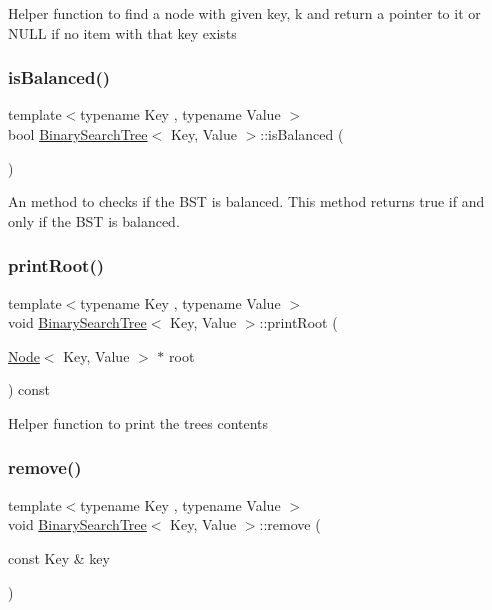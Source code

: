 Helper function to find a node with given key, k and return a pointer to it or N\+U\+LL if no item with that key exists \mbox{\label{classBinarySearchTree_afd462b85819b2ed73bde24c3383b673b}} 
\subsubsection{\texorpdfstring{is\+Balanced()}{isBalanced()}}
{\footnotesize\ttfamily template$<$typename Key , typename Value $>$ \\
bool \mbox{\hyperlink{classBinarySearchTree}{Binary\+Search\+Tree}}$<$ Key, Value $>$\+::is\+Balanced (\begin{DoxyParamCaption}{ }\end{DoxyParamCaption})}

An method to checks if the B\+ST is balanced. This method returns true if and only if the B\+ST is balanced. \mbox{\label{classBinarySearchTree_a6996f52ecfb5a0d1f62432a7b3b792b5}} 
\subsubsection{\texorpdfstring{print\+Root()}{printRoot()}}
{\footnotesize\ttfamily template$<$typename Key , typename Value $>$ \\
void \mbox{\hyperlink{classBinarySearchTree}{Binary\+Search\+Tree}}$<$ Key, Value $>$\+::print\+Root (\begin{DoxyParamCaption}\item[{\mbox{\hyperlink{classNode}{Node}}$<$ Key, Value $>$ $\ast$}]{root }\end{DoxyParamCaption}) const\hspace{0.3cm}{\ttfamily [protected]}}

Helper function to print the tree\textquotesingle{}s contents \mbox{\label{classBinarySearchTree_a23a65055a8e1d1f501f89140c219bda2}} 
\subsubsection{\texorpdfstring{remove()}{remove()}}
{\footnotesize\ttfamily template$<$typename Key , typename Value $>$ \\
void \mbox{\hyperlink{classBinarySearchTree}{Binary\+Search\+Tree}}$<$ Key, Value $>$\+::remove (\begin{DoxyParamCaption}\item[{const Key \&}]{key }\end{DoxyParamCaption})\hspace{0.3cm}{\ttfamily [virtual]}}

